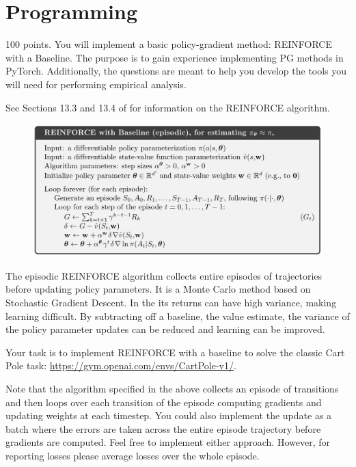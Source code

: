 \documentclass{article}
\begin{document}
\newpage

\section{Programming}
\label{sec:programming}

100 points. You will implement a basic policy-gradient method: REINFORCE with a Baseline. The purpose is to gain experience implementing PG methods in PyTorch. Additionally, the questions are meant to help you develop the tools you will need for performing empirical analysis.

See Sections 13.3 and 13.4 of  for information on the REINFORCE algorithm.

\begin{figure}[h]
\begin{center}
\centerline{\includegraphics[height=\imgheight]{img/REINFORCE.png}}
\caption{\citep{Sutton2018}}
\label{fig:reinforce}
\end{center}
\end{figure}

The episodic REINFORCE algorithm collects entire episodes of trajectories before updating policy parameters. It is a Monte Carlo method based on Stochastic Gradient Descent. In the  its returns can have high variance, making learning difficult. By subtracting off a baseline, the value estimate, the variance of the policy parameter updates can be reduced and learning can be improved.

Your task is to implement REINFORCE with a baseline to solve the classic Cart Pole task: \url{https://gym.openai.com/envs/CartPole-v1/}.

Note that the algorithm specified in the above collects an episode of transitions and then loops over each transition of the episode computing gradients and updating weights at each timestep. You could also implement the update as a batch where the errors are taken across the entire episode trajectory before gradients are computed. Feel free to implement either approach. However, for reporting losses please average losses over the whole episode.
\end{document}
